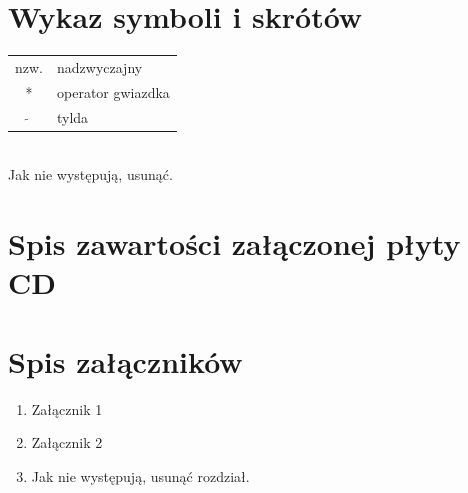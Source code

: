 \documentclass[a4paper,11pt,twoside]{report}
\theoremstyle{definition}
\begin{document}
\chapter*{Wykaz symboli i skrótów}


\begin{tabular}{cl}
nzw. & nadzwyczajny \\
* & operator gwiazdka \\
$\widetilde{}$ & tylda
\end{tabular}
\\
Jak nie występują, usunąć.








\chapter*{Spis zawartości załączonej płyty CD}



\chapter*{Spis załączników}
\begin{enumerate}
\item Załącznik 1
\item Załącznik 2
\item Jak nie występują, usunąć rozdział.
\end{enumerate}
\end{document}
